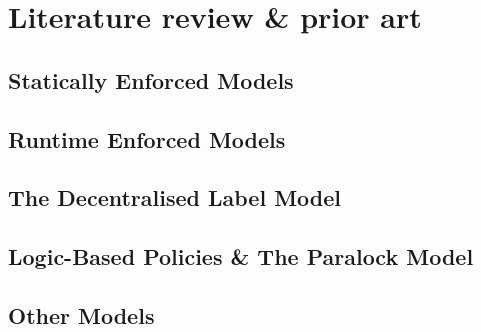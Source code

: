 \chapter{Literature review \& prior art}

\section{Statically Enforced Models}

\section{Runtime Enforced Models}

\section{The Decentralised Label Model}

\section{Logic-Based Policies \& The Paralock Model}

\section{Other Models}